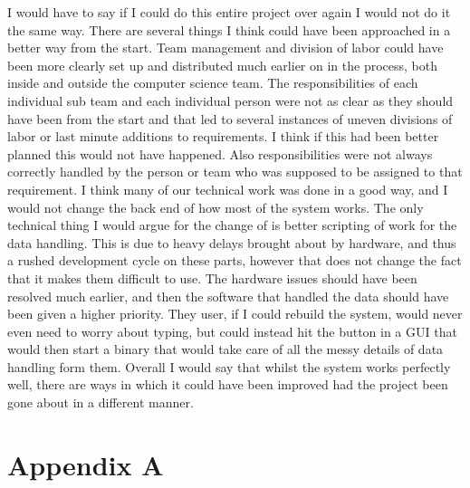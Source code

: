 \documentclass[onecolumn, draftclsnofoot,10pt, compsoc]{IEEEtran}
\begin{document}
I would have to say if I could do this entire project over again I would not do it the same way. There are several things I think could have been approached in a better way from the start. Team management and division of labor could have been more clearly set up and distributed much earlier on in the process, both inside and outside the computer science team. The responsibilities of each individual sub team and each individual person were not as clear as they should have been from the start and that led to several instances of uneven divisions of labor or last minute additions to requirements. I think if this had been better planned this would not have happened. Also responsibilities were not always correctly handled by the person or team who was supposed to be assigned to that requirement. I think many of our technical work was done in a good way, and I would not change the back end of how most of the system works. The only technical thing I would argue for the change of is better scripting of work for the data handling. This is due to heavy delays brought about by hardware, and thus a rushed development cycle on these parts, however that does not change the fact that it makes them difficult to use. The hardware issues should have been resolved much earlier, and then the software that handled the data should have been given a higher priority. They user, if I could rebuild the system, would never even need to worry about typing, but could instead hit the button in a GUI that would then start a binary that would take care of all the messy details of data handling form them. Overall I would say that whilst the system works perfectly well, there are ways in which it could have been improved had the project been gone about in a different manner.
\section{Appendix A}
\end{document}
